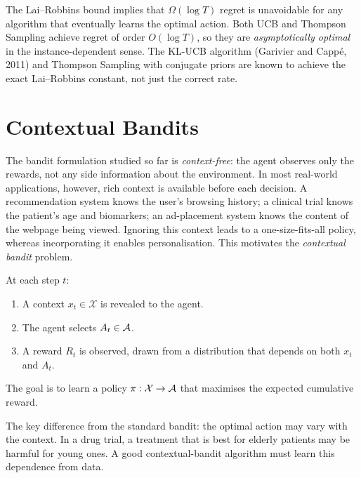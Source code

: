 \begin{remark}
The Lai--Robbins bound implies that $\Omega(\log T)$ regret is unavoidable for any algorithm that eventually learns the optimal action.  Both UCB and Thompson Sampling achieve regret of order $O(\log T)$, so they are \emph{asymptotically optimal} in the instance-dependent sense.  The KL-UCB algorithm (Garivier and Capp\'{e}, 2011) and Thompson Sampling with conjugate priors are known to achieve the exact Lai--Robbins constant, not just the correct rate.
\end{remark}


\section{Contextual Bandits}
\label{sec:contextual}

The bandit formulation studied so far is \emph{context-free}: the agent observes only the rewards, not any side information about the environment.  In most real-world applications, however, rich context is available before each decision.  A recommendation system knows the user's browsing history; a clinical trial knows the patient's age and biomarkers; an ad-placement system knows the content of the webpage being viewed.  Ignoring this context leads to a one-size-fits-all policy, whereas incorporating it enables personalisation.  This motivates the \emph{contextual bandit} problem.

\begin{definition}
\label{def:contextual-bandit}
At each step $t$:
\begin{enumerate}
\item A context $x_t\in\mathcal{X}$ is revealed to the agent.
\item The agent selects $A_t\in\mathcal{A}$.
\item A reward $R_t$ is observed, drawn from a distribution that depends on both $x_t$ and $A_t$.
\end{enumerate}
The goal is to learn a policy $\pi:\mathcal{X}\to\mathcal{A}$ that maximises the expected cumulative reward.
\end{definition}

The key difference from the standard bandit: the optimal action may vary with the context.  In a drug trial, a treatment that is best for elderly patients may be harmful for young ones.  A good contextual-bandit algorithm must learn this dependence from data.

